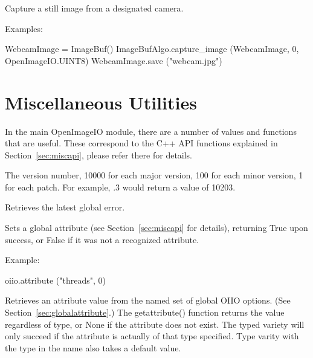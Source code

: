  
Capture a still image from a designated camera. 

\smallskip
\noindent Examples:
\begin{code}
    WebcamImage = ImageBuf()
    ImageBufAlgo.capture_image (WebcamImage, 0, OpenImageIO.UINT8)
    WebcamImage.save ("webcam.jpg")
\end{code}
\apiend


\newpage
\section{Miscellaneous Utilities}
\label{sec:pythonmiscapi}

In the main {\cf OpenImageIO} module, there are a number of values and
functions that are useful.  These correspond to the C++ API functions
explained in Section~\ref{sec:miscapi}, please refer there for details.

The \product version number, 10000 for each
major version, 100 for each minor version, 1 for each patch.  For
example, .3 would return a value of 10203.
\apiend

Retrieves the latest global error.
\apiend

Sets a global attribute (see Section~\ref{sec:miscapi} for details),
returning {\cf True} upon success, or {\cf False} if it was not a
recognized attribute.  

\noindent Example:
\begin{code}
    oiio.attribute ("threads", 0)
\end{code}
\apiend

\NEW %
Retrieves an attribute value from the named set of global OIIO options. (See
Section~\ref{sec:globalattribute}.) The {\cf getattribute()} function
returns the value regardless of type, or {\cf None} if the attribute does
not exist.  The typed variety will only succeed if the attribute is actually
of that type specified. Type varity with the type in the name also takes a
default value.

